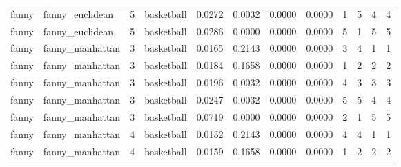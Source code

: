 \documentclass[
]{article}
\begin{document}
\begin{longtable}{| p{1.1cm} | p{2cm} | p{0.8cm} | p{1.3cm} | p{0.60cm} | p{0.7cm} | p{0.65cm} | p{0.65cm} | p{0.65cm} | p{0.65cm} | p{0.7cm} | p{0.65cm} |}
\scriptsize   fanny   & \scriptsize  fanny\_euclidean & \scriptsize    5    & \scriptsize basketball & \scriptsize    0.0272  &  \scriptsize 0.0032 & \scriptsize 0.0000 & \scriptsize    0.0000 & \scriptsize   1  & \scriptsize    5  & \scriptsize    4  & \scriptsize    4 \\
\scriptsize   fanny   & \scriptsize  fanny\_euclidean & \scriptsize    5    & \scriptsize basketball & \scriptsize    0.0286  &  \scriptsize 0.0000 & \scriptsize 0.0000 & \scriptsize    0.0000 & \scriptsize   5  & \scriptsize    1  & \scriptsize    5  & \scriptsize    5 \\
\cline{2-12}
\scriptsize   fanny   & \scriptsize  fanny\_manhattan & \scriptsize    3    & \scriptsize basketball & \scriptsize    0.0165  &  \scriptsize 0.2143 & \scriptsize 0.0000 & \scriptsize    0.0000 & \scriptsize   3  & \scriptsize    4  & \scriptsize    1  & \scriptsize    1 \\
\scriptsize   fanny   & \scriptsize  fanny\_manhattan & \scriptsize    3    & \scriptsize basketball & \scriptsize    0.0184  &  \scriptsize 0.1658 & \scriptsize 0.0000 & \scriptsize    0.0000 & \scriptsize   1  & \scriptsize    2  & \scriptsize    2  & \scriptsize    2 \\
\scriptsize   fanny   & \scriptsize  fanny\_manhattan & \scriptsize    3    & \scriptsize basketball & \scriptsize    0.0196  &  \scriptsize 0.0032 & \scriptsize 0.0000 & \scriptsize    0.0000 & \scriptsize   4  & \scriptsize    3  & \scriptsize    3  & \scriptsize    3 \\
\scriptsize   fanny   & \scriptsize  fanny\_manhattan & \scriptsize    3    & \scriptsize basketball & \scriptsize    0.0247  &  \scriptsize 0.0032 & \scriptsize 0.0000 & \scriptsize    0.0000 & \scriptsize   5  & \scriptsize    5  & \scriptsize    4  & \scriptsize    4 \\
\scriptsize   fanny   & \scriptsize  fanny\_manhattan & \scriptsize    3    & \scriptsize basketball & \scriptsize    0.0719  &  \scriptsize 0.0000 & \scriptsize 0.0000 & \scriptsize    0.0000 & \scriptsize   2  & \scriptsize    1  & \scriptsize    5  & \scriptsize    5 \\
\cline{3-12}
\scriptsize   fanny   & \scriptsize  fanny\_manhattan & \scriptsize    4    & \scriptsize basketball & \scriptsize    0.0152  &  \scriptsize 0.2143 & \scriptsize 0.0000 & \scriptsize    0.0000 & \scriptsize   4  & \scriptsize    4  & \scriptsize    1  & \scriptsize    1 \\
\scriptsize   fanny   & \scriptsize  fanny\_manhattan & \scriptsize    4    & \scriptsize basketball & \scriptsize    0.0159  &  \scriptsize 0.1658 & \scriptsize 0.0000 & \scriptsize    0.0000 & \scriptsize   1  & \scriptsize    2  & \scriptsize    2  & \scriptsize    2 \\

\end{longtable}
\end{document}
